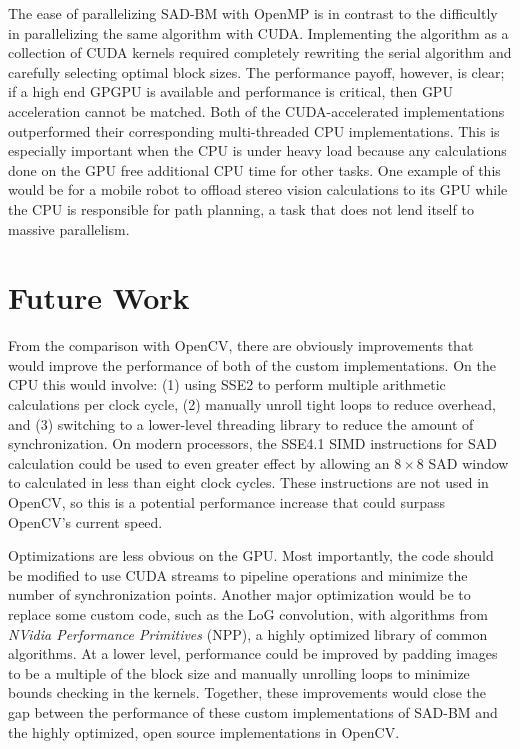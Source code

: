 \documentclass{article}
\begin{document}
The ease of parallelizing SAD-BM with OpenMP is in contrast to the difficultly
in parallelizing the same algorithm with CUDA. Implementing the algorithm as a
collection of CUDA kernels required completely rewriting the serial algorithm
and carefully selecting optimal block sizes. The performance payoff, however,
is clear; if a high end GPGPU is available and performance is critical, then
GPU acceleration cannot be matched. Both of the CUDA-accelerated
implementations outperformed their corresponding multi-threaded CPU
implementations. This is especially important when the CPU is under heavy load
because any calculations done on the GPU free additional CPU time for other
tasks. One example of this would be for a mobile robot to offload stereo vision
calculations to its GPU while the CPU is responsible for path planning, a task
that does not lend itself to massive parallelism.

\section{Future Work}
\label{sec:future}
From the comparison with OpenCV, there are obviously improvements that would
improve the performance of both of the custom implementations. On the CPU this
would involve: (1) using SSE2 to perform multiple arithmetic calculations per
clock cycle, (2) manually unroll tight loops to reduce overhead, and (3)
switching to a lower-level threading library to reduce the amount of
synchronization. On modern processors, the SSE4.1 SIMD instructions for SAD
calculation could be used to even greater effect by allowing an $8 \times 8$
SAD window to calculated in less than eight clock cycles. These instructions
are not used in OpenCV, so this is a potential performance increase that could
surpass OpenCV's current speed.

Optimizations are less obvious on the GPU. Most importantly, the code should be
modified to use CUDA streams to pipeline operations and minimize the number of
synchronization points. Another major optimization would be to replace some
custom code, such as the LoG convolution, with algorithms from \textit{NVidia
Performance Primitives} (NPP), a highly optimized library of common algorithms.
At a lower level, performance could be improved by padding images to be a
multiple of the block size and manually unrolling loops to minimize bounds
checking in the kernels. Together, these improvements would close the gap
between the performance of these custom implementations of SAD-BM and the
highly optimized, open source implementations in OpenCV.

{}

\end{document}
